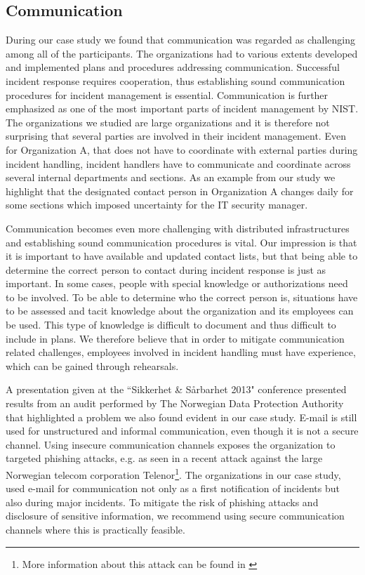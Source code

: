 \subsection{Communication}
During our case study we found that communication was regarded as challenging among all of the participants. The organizations had to various extents developed and implemented plans and procedures addressing communication. Successful incident response requires cooperation, thus establishing sound communication procedures for incident management is essential. Communication is further emphasized as one of the most important parts of incident management by NIST. The organizations we studied are large organizations and it is therefore not surprising that several parties are involved in their incident management. Even for Organization A, that does not have to coordinate with external parties during incident handling, incident handlers have to communicate and coordinate across several internal departments and sections. As an example from our study we highlight that the designated contact person in Organization A changes daily for some sections which imposed uncertainty for the IT security manager. 

Communication becomes even more challenging with distributed infrastructures and establishing sound communication procedures is vital. Our impression is that it is important to have available and updated contact lists, but that being able to determine the correct person to contact during incident response is just as important. In some cases, people with special knowledge or authorizations need to be involved. To be able to determine who the correct person is, situations have to be assessed and tacit knowledge about the organization and its employees can be used. This type of knowledge is difficult to document and thus difficult to include in plans. We therefore believe that in order to mitigate communication related challenges, employees involved in incident handling must have experience, which can be gained through rehearsals. 

A presentation given at the ``Sikkerhet \& S\aa rbarhet 2013" conference presented results from an audit performed by The Norwegian Data Protection Authority that highlighted a problem we also found evident in our case study. E-mail is still used for unstructured and informal communication, even though it is not a secure channel. Using insecure communication channels exposes the organization to targeted phishing attacks, e.g. as seen in a recent attack against the large Norwegian telecom corporation Telenor\footnote{More information about this attack can be found in \cite{phisingattack}}. The organizations in our case study, used e-mail for communication not only as a first notification of incidents but also during major incidents. To mitigate the risk of phishing attacks and disclosure of sensitive information, we recommend using secure communication channels where this is practically feasible. 


